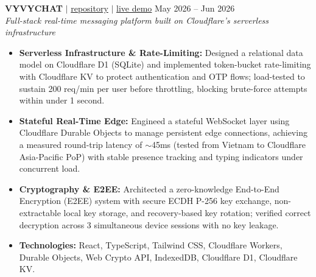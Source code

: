 \documentclass[10pt,a4paper]{article}
\begin{document}
\noindent \textbf{VYVYCHAT} $|$ \href{https://github.com/vyquochuy/vyvychat}{repository} $|$ \href{https://vyvychat.myvault-service.workers.dev/}{live demo} \hfill May 2026 -- Jun 2026\\
\textit{Full-stack real-time messaging platform built on Cloudflare's serverless infrastructure}
\begin{itemize}[leftmargin=0.25in, nosep]
    \item \textbf{Serverless Infrastructure \& Rate-Limiting:} Designed a relational data model on Cloudflare D1 (SQLite) and implemented token-bucket rate-limiting with Cloudflare KV to protect authentication and OTP flows; load-tested to sustain 200 req/min per user before throttling, blocking brute-force attempts within under 1 second.
    \item \textbf{Stateful Real-Time Edge:} Engineed a stateful WebSocket layer using Cloudflare Durable Objects to manage persistent edge connections, achieving a measured round-trip latency of $\sim$45ms (tested from Vietnam to Cloudflare Asia-Pacific PoP) with stable presence tracking and typing indicators under concurrent load.
    \item \textbf{Cryptography \& E2EE:} Architected a zero-knowledge End-to-End Encryption (E2EE) system with secure ECDH P-256 key exchange, non-extractable local key storage, and recovery-based key rotation; verified correct decryption across 3 simultaneous device sessions with no key leakage.
    \item \textbf{Technologies:} React, TypeScript, Tailwind CSS, Cloudflare Workers, Durable Objects, Web Crypto API, IndexedDB, Cloudflare D1, Cloudflare KV.
\end{itemize}
\vspace{10pt}
\end{document}
